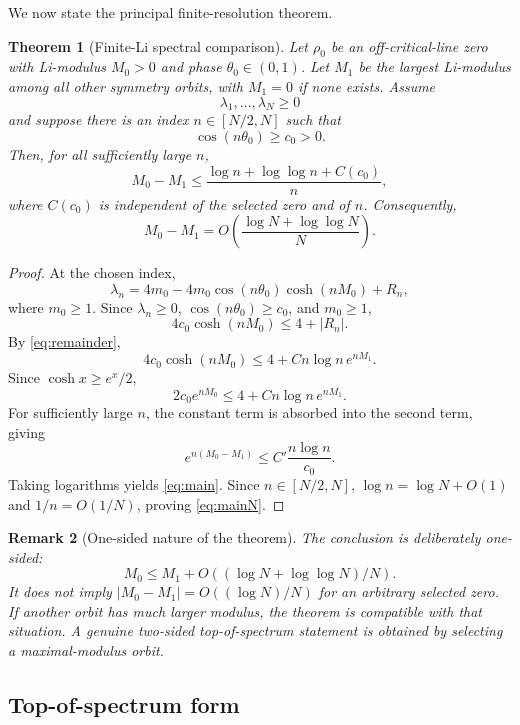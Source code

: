 \documentclass[11pt]{article}
\newtheorem{theorem}{Theorem}[section]
\newtheorem{remark}[theorem]{Remark}
\newcommand{\Li}{\lambda}
\begin{document}
We now state the principal finite-resolution theorem.

\begin{theorem}[Finite-Li spectral comparison]
\label{thm:main}
Let \(\rho_0\) be an off-critical-line zero with Li-modulus \(M_0>0\) and phase \(\theta_0\in(0,1)\). Let \(M_1\) be the largest Li-modulus among all other symmetry orbits, with \(M_1=0\) if none exists. Assume
\[
\Li_1,\ldots,\Li_N\ge0
\]
and suppose there is an index \(n\in[N/2,N]\) such that
\[
\cos(n\theta_0)\ge c_0>0.
\]
Then, for all sufficiently large \(n\),
\begin{equation}
M_0-M_1
\le
\frac{\log n+\log\log n+C(c_0)}{n},
\label{eq:main}
\end{equation}
where \(C(c_0)\) is independent of the selected zero and of \(n\).
Consequently,
\begin{equation}
M_0-M_1
=O\left(\frac{\log N+\log\log N}{N}\right).
\label{eq:mainN}
\end{equation}
\end{theorem}

\begin{proof}
At the chosen index,
\[
\Li_n
=4m_0-4m_0\cos(n\theta_0)\cosh(nM_0)+R_n,
\]
where \(m_0\ge1\). Since \(\Li_n\ge0\), \(\cos(n\theta_0)\ge c_0\), and \(m_0\ge1\),
\[
4c_0\cosh(nM_0)
\le4+|R_n|.
\]
By \eqref{eq:remainder},
\[
4c_0\cosh(nM_0)
\le4+Cn\log n\,e^{nM_1}.
\]
Since \(\cosh x\ge e^x/2\),
\[
2c_0e^{nM_0}
\le4+Cn\log n\,e^{nM_1}.
\]
For sufficiently large \(n\), the constant term is absorbed into the second term, giving
\[
e^{n(M_0-M_1)}
\le C'\frac{n\log n}{c_0}.
\]
Taking logarithms yields \eqref{eq:main}. Since \(n\in[N/2,N]\), \(\log n=\log N+O(1)\) and \(1/n=O(1/N)\), proving \eqref{eq:mainN}.
\end{proof}

\begin{remark}[One-sided nature of the theorem]
The conclusion is deliberately one-sided:
\[
M_0\le M_1+O((\log N+\log\log N)/N).
\]
It does not imply \(|M_0-M_1|=O((\log N)/N)\) for an arbitrary selected zero. If another orbit has much larger modulus, the theorem is compatible with that situation. A genuine two-sided top-of-spectrum statement is obtained by selecting a maximal-modulus orbit.
\end{remark}

\subsection{Top-of-spectrum form}
\end{document}
